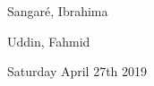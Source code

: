 \documentclass[12pt]{report}
\begin{document}
\vspace{\baselineskip}
\begin{Center}
Sangaré, Ibrahima
\end{Center}\par

\begin{Center}
Uddin, Fahmid
\end{Center}\par


\vspace{\baselineskip}

\vspace{\baselineskip}

\vspace{\baselineskip}

\vspace{\baselineskip}

\vspace{\baselineskip}

\vspace{\baselineskip}

\vspace{\baselineskip}

\vspace{\baselineskip}

\vspace{\baselineskip}

\vspace{\baselineskip}

\vspace{\baselineskip}

\vspace{\baselineskip}

\vspace{\baselineskip}

\vspace{\baselineskip}
\begin{Center}
Saturday April 27th 2019
\end{Center}\par


\vspace{\baselineskip}

\vspace{\baselineskip}

\vspace{\baselineskip}

\vspace{\baselineskip}

\vspace{\baselineskip}
\end{document}

